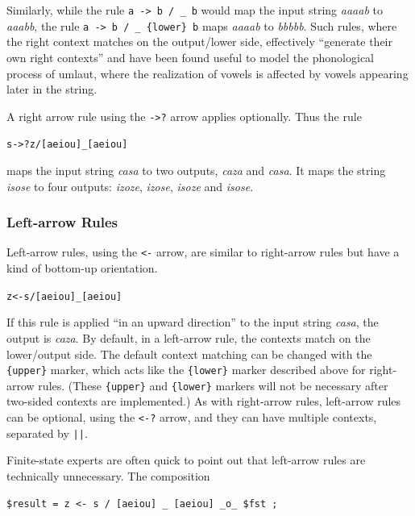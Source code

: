 \documentclass[letterpaper,12pt]{article}
\begin{document}
Similarly, while the rule \texttt{a -> b / \_ b} would map the input
string \emph{aaaab} to \emph{aaabb}, the rule 
\texttt{a -> b / \_ \{lower\} b} 
maps \emph{aaaab} to \emph{bbbbb}.  Such rules, where the
right context matches on the output/lower side, effectively ``generate
their own right contexts'' and have been found useful to model the
phonological process of umlaut, where the realization of vowels is
affected by vowels appearing later in the string.

A right arrow rule using the \texttt{->?} arrow applies optionally.  Thus
the rule

\begin{alltt}
s ->? z / [aeiou] _ [aeiou]
\end{alltt}

\noindent
maps the input string \emph{casa} to two outputs, \emph{caza} and
\emph{casa}.  It maps the string \emph{isose} to four outputs:
\emph{izoze}, \emph{izose}, \emph{isoze} and \emph{isose}.

\subsubsection{Left-arrow Rules}

Left-arrow rules, using the \texttt{<-} arrow, are similar to right-arrow
rules but have a kind of bottom-up orientation.

\begin{alltt}
z <- s / [aeiou] _ [aeiou]
\end{alltt}

\noindent
If this rule is applied ``in an upward direction'' to the input string
\emph{casa}, the output is \emph{caza}.  By default, in a left-arrow
rule, the contexts match on the lower/output side.  The default context
matching can be changed with the \texttt{\{upper\}} marker, which acts
like the \texttt{\{lower\}} marker described above for right-arrow rules.
(These \texttt{\{upper\}} and \texttt{\{lower\}} markers will not be
necessary after two-sided contexts are implemented.)  As with right-arrow
rules, left-arrow rules can be optional, using the \texttt{<-?} arrow,
and they can have multiple contexts, separated by \texttt{||}.

Finite-state experts are often quick to point out that left-arrow rules
are technically unnecessary.  The composition

\begin{Verbatim}[fontsize=\small]
$result = z <- s / [aeiou] _ [aeiou] _o_ $fst ;
\end{Verbatim}
\end{document}

